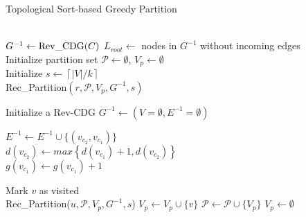 \begin{algorithm}[t]
\caption{Topological Sort-based Greedy Partition }
\label{alg:partition}


\\

$G^{-1}\gets {\rm Rev\_CDG}(C)$  \label{stmt:rev_cdg_construct}
$L_{root}\gets$ nodes in $G^{-1}$ without incoming edges \label{stmt:root}\\
Initialize partition set $\mathcal{P} \gets \emptyset$, $V_p\gets \emptyset$\\
Initialize $s \gets \left\lceil {|V|}/{k} \right\rceil$ \label{stmt:partition_size}\\

 {
    {Rec\_Partition}{$(r, \mathcal{P}, V_p, G^{-1}, s)$} \label{stmt:root_partition_end}
}
     \label{stmt:return_partition}\\
\vspace{5pt}
 {
    Initialize a Rev-CDG $G^{-1} \gets (V=\emptyset, E^{-1}=\emptyset)$ \label{stmt:rev_cdg_init}\\
     {
         {
            $E^{-1}\gets E^{-1}\cup \{(v_{c_2}, v_{c_1})\}$\\
            $d(v_{c_2}) \gets max\left\{d(v_{c_1}) + 1, d(v_{c_2})\right\}$\\
            $g(v_{c_1})\gets g(v_{c_1})+1$ \label{stmt:add_edge_end}
        }
        
    }
}

\vspace{5pt}
 {    
     {
        \Return
    }
     Mark $v$ as visited\\
     {
        {Rec\_Partition}{($u, \mathcal{P}, V_p, G^{-1}, s$)} \label{stmt:explore_children_end}
    }
    $V_p\gets V_p\cup \{v\}$ 
     {
        $\mathcal{P}\gets \mathcal{P}\cup \{V_p\}$  \label{stmt:add_to_partition}
        $V_p\gets \emptyset$ \label{stmt:add_new_partition_end}\label{stmt:rec_partition_end}
    }
}

\end{algorithm}



